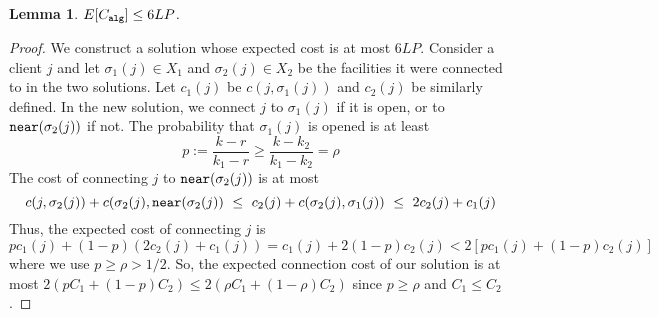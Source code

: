 \documentclass[11pt]{article}
\newtheorem{lemma}{Lemma}
\def\alg{{\tt alg}}
\begin{document}
\begin{lemma}
$E[C_{\alg}] \le 6 LP$.
\end{lemma}
\begin{proof}
We construct a solution whose expected cost is at most $6LP$.
Consider a client $j$ and let $\sigma_1(j)\in X_1$ and $\sigma_2(j)\in X_2$ be the facilities it were connected to in the two solutions. Let $c_1(j)$ be $c(j,\sigma_1(j))$ and $c_2(j)$ be similarly defined.
In the new solution, we connect $j$ to $\sigma_1(j)$ if it is open, or to ${\tt near}(\sigma_2(j))$ if not. The probability that $\sigma_1(j)$ is opened is at least 
$$p := \frac{k - r}{k_1 - r} \ge \frac{k - k_2}{k_1 - k_2} = \rho$$
The cost of connecting $j$ to ${\tt near}(\sigma_2(j))$ is at most 
$$c(j,\sigma_2(j)) + c(\sigma_2(j),{\tt near}(\sigma_2(j)) ~\le ~ c_2(j) + c(\sigma_2(j),\sigma_1(j)) 
~\le ~ 2c_2(j) + c_1(j)$$
Thus, the expected cost of connecting $j$ is 
$$pc_1(j) + (1-p)(2c_2(j) + c_1(j)) = c_1(j) + 2(1-p)c_2(j) < 2[pc_1(j) + (1-p)c_2(j)]$$
where we use $p \ge \rho > 1/2$.
So, the expected connection cost of our solution is at most $2(pC_1 + (1-p)C_2) \le 2(\rho C_1 + (1-\rho)C_2)$
since $p\ge \rho$ and $C_1 \le C_2$.
\end{proof}
\end{document}
